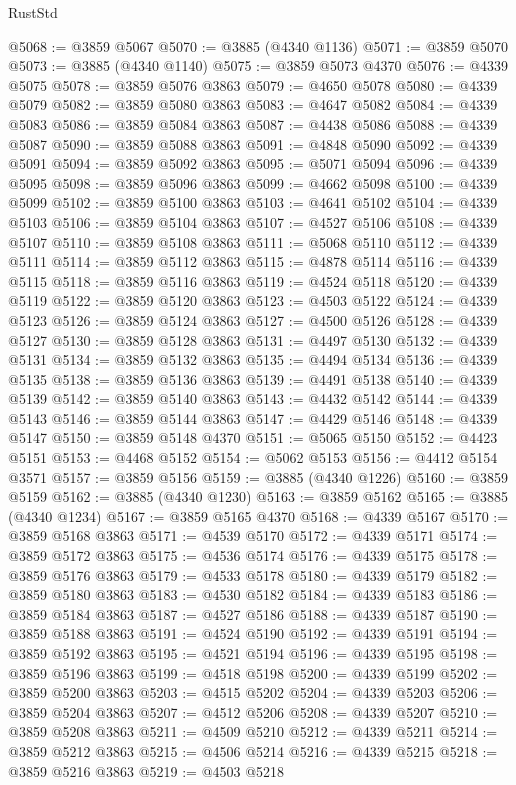 \begin{lexlean}{RustStd}
\begin{coremodule}
@5068 := @3859 @5067
@5070 := @3885 (@4340 @1136)
@5071 := @3859 @5070
@5073 := @3885 (@4340 @1140)
@5075 := @3859 @5073 @4370
@5076 := @4339 @5075
@5078 := @3859 @5076 @3863
@5079 := @4650 @5078
@5080 := @4339 @5079
@5082 := @3859 @5080 @3863
@5083 := @4647 @5082
@5084 := @4339 @5083
@5086 := @3859 @5084 @3863
@5087 := @4438 @5086
@5088 := @4339 @5087
@5090 := @3859 @5088 @3863
@5091 := @4848 @5090
@5092 := @4339 @5091
@5094 := @3859 @5092 @3863
@5095 := @5071 @5094
@5096 := @4339 @5095
@5098 := @3859 @5096 @3863
@5099 := @4662 @5098
@5100 := @4339 @5099
@5102 := @3859 @5100 @3863
@5103 := @4641 @5102
@5104 := @4339 @5103
@5106 := @3859 @5104 @3863
@5107 := @4527 @5106
@5108 := @4339 @5107
@5110 := @3859 @5108 @3863
@5111 := @5068 @5110
@5112 := @4339 @5111
@5114 := @3859 @5112 @3863
@5115 := @4878 @5114
@5116 := @4339 @5115
@5118 := @3859 @5116 @3863
@5119 := @4524 @5118
@5120 := @4339 @5119
@5122 := @3859 @5120 @3863
@5123 := @4503 @5122
@5124 := @4339 @5123
@5126 := @3859 @5124 @3863
@5127 := @4500 @5126
@5128 := @4339 @5127
@5130 := @3859 @5128 @3863
@5131 := @4497 @5130
@5132 := @4339 @5131
@5134 := @3859 @5132 @3863
@5135 := @4494 @5134
@5136 := @4339 @5135
@5138 := @3859 @5136 @3863
@5139 := @4491 @5138
@5140 := @4339 @5139
@5142 := @3859 @5140 @3863
@5143 := @4432 @5142
@5144 := @4339 @5143
@5146 := @3859 @5144 @3863
@5147 := @4429 @5146
@5148 := @4339 @5147
@5150 := @3859 @5148 @4370
@5151 := @5065 @5150
@5152 := @4423 @5151
@5153 := @4468 @5152
@5154 := @5062 @5153
@5156 := @4412 @5154 @3571
@5157 := @3859 @5156
@5159 := @3885 (@4340 @1226)
@5160 := @3859 @5159
@5162 := @3885 (@4340 @1230)
@5163 := @3859 @5162
@5165 := @3885 (@4340 @1234)
@5167 := @3859 @5165 @4370
@5168 := @4339 @5167
@5170 := @3859 @5168 @3863
@5171 := @4539 @5170
@5172 := @4339 @5171
@5174 := @3859 @5172 @3863
@5175 := @4536 @5174
@5176 := @4339 @5175
@5178 := @3859 @5176 @3863
@5179 := @4533 @5178
@5180 := @4339 @5179
@5182 := @3859 @5180 @3863
@5183 := @4530 @5182
@5184 := @4339 @5183
@5186 := @3859 @5184 @3863
@5187 := @4527 @5186
@5188 := @4339 @5187
@5190 := @3859 @5188 @3863
@5191 := @4524 @5190
@5192 := @4339 @5191
@5194 := @3859 @5192 @3863
@5195 := @4521 @5194
@5196 := @4339 @5195
@5198 := @3859 @5196 @3863
@5199 := @4518 @5198
@5200 := @4339 @5199
@5202 := @3859 @5200 @3863
@5203 := @4515 @5202
@5204 := @4339 @5203
@5206 := @3859 @5204 @3863
@5207 := @4512 @5206
@5208 := @4339 @5207
@5210 := @3859 @5208 @3863
@5211 := @4509 @5210
@5212 := @4339 @5211
@5214 := @3859 @5212 @3863
@5215 := @4506 @5214
@5216 := @4339 @5215
@5218 := @3859 @5216 @3863
@5219 := @4503 @5218

\end{coremodule}
\end{lexlean}
